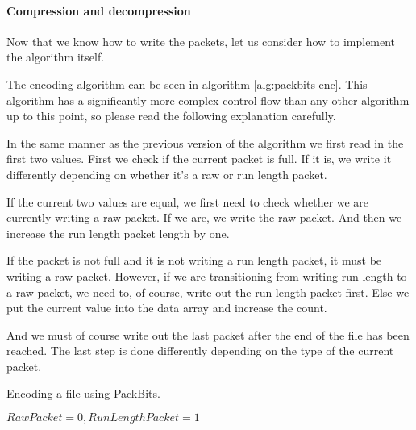 \begin{refsection}
\paragraph{Compression and decompression}
\label{sec:compr-decompr}

Now that we know how to write the packets, let us consider how to
implement the algorithm itself.

The encoding algorithm can be seen in algorithm
\ref{alg:packbits-enc}. This algorithm has a significantly more
complex control flow than any other algorithm up to this point, so please
read the following explanation carefully.

In the same manner as the previous version of the algorithm we first
read in the first two values. First we check if the current packet is
full. If it is, we write it differently depending on whether it's a
raw or run length packet.

If the current two values are equal, we first need to check whether we
are currently writing a raw packet. If we are, we write the raw
packet. And then we increase the run length packet length by one.

If the packet is not full and it is not writing a run length packet,
it must be writing a raw packet. However, if we are transitioning from
writing run length to a raw packet, we need to, of course, write out
the run length packet first. Else we put the current value into the
data array and increase the count.

And we must of course write out the last packet after the end of the
file has been reached. The last step is done differently depending on
the type of the current packet. 

\begin{algorithm}[h]
  \caption{Encoding a file using PackBits.}
  \label{alg:packbits-enc}
  \begin{algorithmic}[1]
    \Require $RawPacket = 0,RunLengthPacket = 1$


    \While{\neof}


            \State {}


\end{algorithmic}
\end{algorithm}
\end{refsection}
